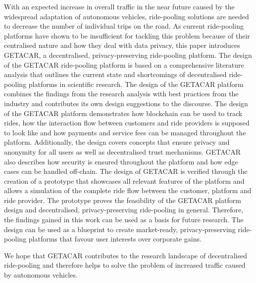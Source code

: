 With an expected increase in overall traffic in the near future caused by the widespread adaptation of autonomous vehicles, ride-pooling solutions are needed to decrease the number of individual trips on the road. As current ride-pooling platforms have shown to be insufficient for tackling this problem because of their centralised nature and how they deal with data privacy, this paper introduces GETACAR, a decentralised, privacy-preserving ride-pooling platform. The design of the GETACAR ride-pooling platform is based on a comprehensive literature analysis that outlines the current state and shortcomings of decentralised ride-pooling platforms in scientific research. The design of the GETACAR platform combines the findings from the research analysis with best practices from the industry and contributes its own design suggestions to the discourse. The design of the GETACAR platform demonstrates how blockchain can be used to track rides,  how the interaction flow between customers and ride providers is supposed to look like and how payments and service fees can be managed throughout the platform. Additionally, the design covers concepts that ensure privacy and anonymity for all users as well as decentralised trust mechanisms. GETACAR also describes how security is ensured throughout the platform and how edge cases can be handled off-chain. 
The design of GETACAR is verified through the creation of a prototype that showcases all relevant features of the platform and allows a simulation of the complete ride flow between the customer, platform and ride provider. The prototype proves the feasibility of the GETACAR platform design and decentralised, privacy-preserving ride-pooling in general. Therefore, the findings gained in this work can be used as a basis for future research. The design can be used as a blueprint to create market-ready,  privacy-preserving ride-pooling platforms that favour user interests over corporate gains. 

We hope that GETACAR contributes to the research landscape of decentralised ride-pooling and therefore helps to solve the problem of increased traffic caused by autonomous vehicles.